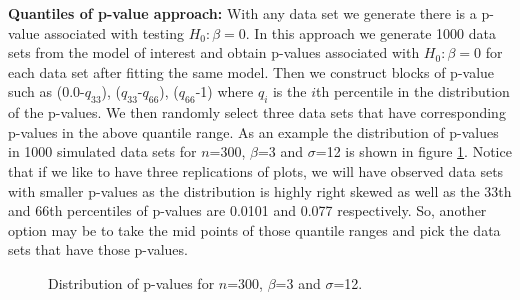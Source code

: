 \documentclass{article}
\begin{document}
{\bf Quantiles of p-value approach:} With any data set we generate there is a p-value associated with testing $H_0: \beta=0$. In this approach we generate 1000 data sets from the model of interest and obtain p-values associated with $H_0: \beta=0$ for each data set after fitting the same model. Then we construct blocks of p-value such as (0.0-$q_{33}$), ($q_{33}$-$q_{66}$), ($q_{66}$-1) where $q_i$ is the $i$th percentile in the distribution of the p-values. We then randomly select three data sets that have corresponding p-values in the above quantile range. As an example the distribution  of p-values in 1000 simulated data sets for $n$=300, $\beta$=3 and $\sigma$=12 is shown in figure \ref{fig:dist_pvalue}.  Notice that if we like to have three replications of plots, we will have observed data sets with smaller p-values as the distribution is highly right skewed as well as the 33th and 66th percentiles of p-values are 0.0101 and 0.077 respectively. So, another option may be to take the mid points of those quantile ranges and pick the data sets that have those p-values.\\

\begin{figure}[hbtp]
   \centering
       \caption{Distribution of p-values for $n$=300, $\beta$=3 and $\sigma$=12.}
       \label{fig:dist_pvalue}
\end{figure}
\end{document}
